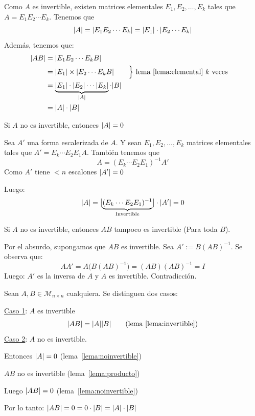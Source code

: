 \documentclass[11pt,a4paper]{article}
\newcommand{\M}{\mathcal{M}}
\begin{document}
\begin{demo}
Como $A$ es invertible, existen matrices elementales $E_1,E_2,\dots,E_k$ tales que $A=E_1E_2\cdots E_k$. Tenemos que
\[
\abs{A}=\abs{E_1E_2\cdots E_k}=\abs{E_1}\cdot\abs{E_2\cdots E_k}
\]
Además, tenemos que:
\begin{align*}
\abs{AB}&=\abs{E_1E_2\cdots E_kB}\\
&=\abs{E_1}\times\abs{E_2\cdots E_kB} && \Big\}\ \text{lema~\ref{lema:elemental} $k$ veces}\\
&=\underbrace{\abs{E_1}\cdot\abs{E_2}\cdots\abs{E_k}}_{\abs{A}}\cdot\abs{B}\\
&=\abs{A}\cdot\abs{B}
\end{align*}
\end{demo}

\begin{lema}\label{lema:noinvertible}
Si $A$ no es invertible, entonces $\abs{A}=0$
\end{lema}

\begin{demo}
Sea $A'$ una forma escalerizada de $A$. Y sean $E_1,E_2,\dots,E_k$ matrices elementales tales que $A'=E_k\cdots E_2E_1A$. También tenemos que
\[
A=(E_k\cdots E_2E_1)^{-1}A'
\]
Como $A'$ tiene $<n$ escalones \quad $\abs{A'}=0$

Luego:
\[
\abs{A}=\abs[\big]{\underbrace{(E_k\cdots E_2E_1)^{-1}}_{\text{Invertible}}}\cdot\abs{A'}=0
\]
\end{demo}

\begin{lema}\label{lema:producto}
Si $A$ no es invertible, entonces $AB$ tampoco es invertible (Para toda $B$).
\end{lema}

\begin{demo}
Por el absurdo, supongamos que $AB$ es invertible. Sea $A':=B(AB)^{-1}$. Se observa que:
\[
AA'=A\bigl(B(AB)^{-1}\bigr)=(AB)(AB)^{-1}=I
\]
Luego: $A'$ es la inversa de $A$ y $A$ es invertible. \hfill Contradicción.
\end{demo}

\begin{demo}
Sean $A,B\in\M_{n\times n}$ cualquiera. Se distinguen dos casos:

\underline{Caso 1}: $A$ es invertible
\[
\abs{AB}=\abs{A}\abs{B}\qquad(\text{lema~\ref{lema:invertible}})
\]
\underline{Caso 2}: $A$ no es invertible.

Entonces $\abs{A}=0$ (lema~\ref{lema:noinvertible})

$AB$ no es invertible (lema~\ref{lema:producto})

Luego $\abs{AB}=0$ (lema~\ref{lema:noinvertible})

Por lo tanto: $\abs{AB}=0=0\cdot\abs{B}=\abs{A}\cdot\abs{B}$
\end{demo}
\end{document}
